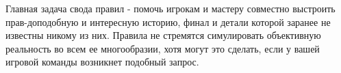 \begin{tcolorbox}
    Главная задача свода правил - помочь игрокам и мастеру совместно выстроить прав-доподобную и интересную историю, финал и детали которой заранее не известны никому из них. Правила не стремятся симулировать объективную реальность во всем ее многообразии, хотя могут это сделать, если у вашей игровой команды возникнет подобный запрос.
\end{tcolorbox}




